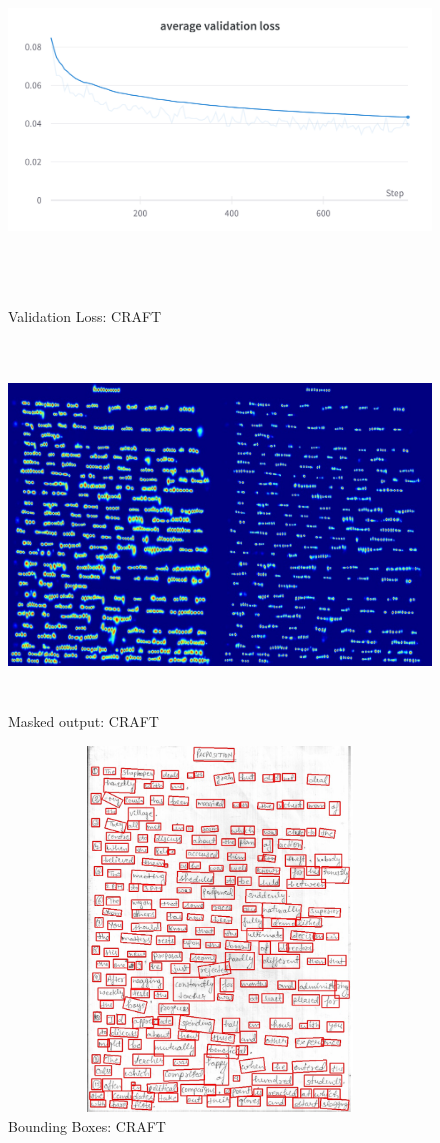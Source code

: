 \begin{figure}[H]
	\includegraphics[width=475pt,height=275pt]{Validation Loss CRAFT.png}
	\caption{Validation Loss: CRAFT}
\end{figure}


\begin{figure}[H]
	\includegraphics[width=475pt,height=275pt]{craft_mask.jpg}
	\caption{Masked output: CRAFT}
\end{figure}

\begin{figure}[H]
	\includegraphics[width=475pt,height=275pt]{craft_out.jpg}
	\caption{Bounding Boxes: CRAFT}
\end{figure}

